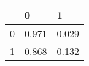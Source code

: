 \begin{tabular}{lll}
\toprule
 & 0 & 1 \\
\midrule
0 & 0.971 & 0.029 \\
1 & 0.868 & 0.132 \\
\bottomrule
\end{tabular}
